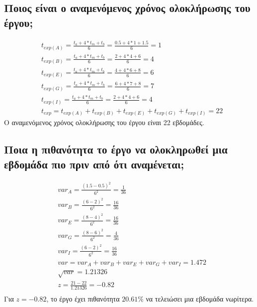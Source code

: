 \documentclass[12pt]{turabian-researchpaper}
\begin{document}
\subsection{Ποιος είναι ο αναμενόμενος χρόνος ολοκλήρωσης του έργου;}
\begin{equation*}
    \begin{aligned}
         & t_{exp(A)} = \frac{t_a+4*t_m+t_b}{6} = \frac{0.5+4*1+1.5}{6} = 1                 \\
         & t_{exp(B)} = \frac{t_a+4*t_m+t_b}{6} = \frac{2+4*4+6}{6} = 4                     \\
         & t_{exp(E)} = \frac{t_a+4*t_m+t_b}{6} = \frac{4+4*6+8}{6} = 6                     \\
         & t_{exp(G)} = \frac{t_a+4*t_m+t_b}{6} = \frac{6+4*7+8}{6} = 7                     \\
         & t_{exp(I)} = \frac{t_a+4*t_m+t_b}{6} = \frac{2+4*4+6}{6} = 4                     \\
         & t_{exp}    = t_{exp(A)} + t_{exp(B)} +t_{exp(E)} +t_{exp(G)}+    t_{exp(I)} = 22
    \end{aligned}
\end{equation*}
Ο αναμενόμενος χρόνος ολοκλήρωσης του έργου είναι 22 εβδομάδες.

\subsection{Ποια η πιθανότητα το έργο να ολοκληρωθεί μια εβδομάδα πιο πριν από ότι αναμένεται;}
\begin{equation*}
    \begin{aligned}
         & var_A = \frac{(1.5-0.5)^2}{6^2} = \frac{1}{36}        \\
         & var_B = \frac{(6-2)^2}{6^2} = \frac{16}{36}           \\
         & var_E = \frac{(8-4)^2}{6^2} = \frac{16}{36}           \\
         & var_G = \frac{(8-6)^2}{6^2} = \frac{4}{36}            \\
         & var_I = \frac{(6-2)^2}{6^2} = \frac{16}{36}           \\
         & var   = var_A + var_B + var_E + var_G + var_I = 1.472 \\
         & \sqrt{var} = 1.21326                                  \\
         & z = \frac{21-22}{1.21326} = -0.82                     \\
    \end{aligned}
\end{equation*}
Για $ z = -0.82 $, το έργο έχει πιθανότητα $ 20.61 \% $ να τελειώσει μια εβδομάδα νωρίτερα.
\end{document}

